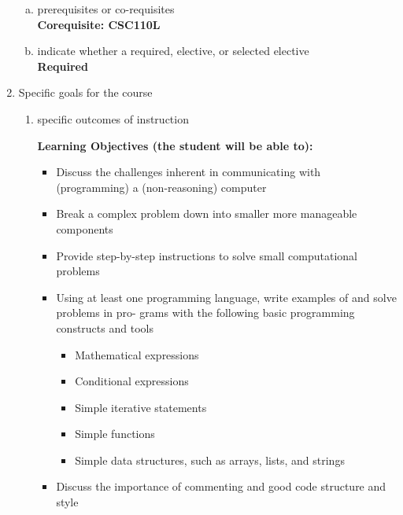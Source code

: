 \begin{enumerate}[1.]
\begin{enumerate}[a.]
\item prerequisites or co-requisites\\
  {\bfseries
    Corequisite: CSC110L
  }

\item indicate whether a required, elective, or selected elective\\ %
  {\bfseries
    Required
  }

\end{enumerate}

\item Specific goals for the course
\begin{enumerate}
\item specific outcomes of instruction\\ %
  {\bfseries
    Learning Objectives (the student will be able to):
    \begin{itemize}
      \item Discuss the challenges inherent in communicating with (programming) a (non-reasoning)
computer
      \item Break a complex problem down into smaller more manageable components
      \item Provide step-by-step instructions to solve small computational problems
      \item Using at least one programming language, write examples of and solve problems in pro-
grams with the following basic programming constructs and tools
          \begin{itemize}
            \item Mathematical expressions
            \item Conditional expressions
            \item Simple iterative statements
            \item Simple functions
            \item Simple data structures, such as arrays, lists, and strings
          \end{itemize}
      \item Discuss the importance of commenting and good code structure and style
    \end{itemize}
  }


\end{enumerate}
\end{enumerate}
